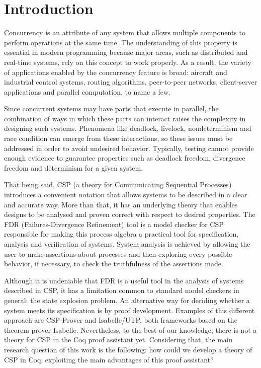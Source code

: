 \chapter{Introduction}

Concurrency is an attribute of any system that allows multiple components to perform operations at the same time. The understanding of this property is essential in modern programming because major areas, such as distributed and real-time systems, rely on this concept to work properly. As a result, the variety of applications enabled by the concurrency feature is broad: aircraft and industrial control systems, routing algorithms, peer-to-peer networks, client-server applications and parallel computation, to name a few.

Since concurrent systems may have parts that execute in parallel, the combination of ways in which these parts can interact raises the complexity in designing such systems. Phenomena like deadlock, livelock, nondeterminism and race condition can emerge from these interactions, so these issues must be addressed in order to avoid undesired behavior. Typically, testing cannot provide enough evidence to guarantee properties such as deadlock freedom, divergence freedom and determinism for a given system.

That being said, CSP (a theory for Communicating Sequential Processes) introduces a convenient notation that allows systems to be described in a clear and accurate way. More than that, it has an underlying theory that enables designs to be analysed and proven correct with respect to desired properties. The FDR (Failures-Divergence Refinement) tool is a model checker for CSP responsible for making this process algebra a practical tool for specification, analysis and verification of systems. System analysis is achieved by allowing the user to make assertions about processes and then exploring every possible behavior, if necessary, to check the truthfulness of the assertions made.

Although it is undeniable that FDR is a useful tool in the analysis of systems described in CSP, it has a limitation common to standard model checkers in general: the state explosion problem. An alternative way for deciding whether a system meets its specification is by proof development. Examples of this different approach are CSP-Prover and Isabelle/UTP, both frameworks based on the theorem prover Isabelle. Nevertheless, to the best of our knowledge, there is not a theory for CSP in the Coq proof assistant yet. Considering that, the main research question of this work is the following: how could we develop a theory of CSP in Coq, exploiting the main advantages of this proof assistant?

